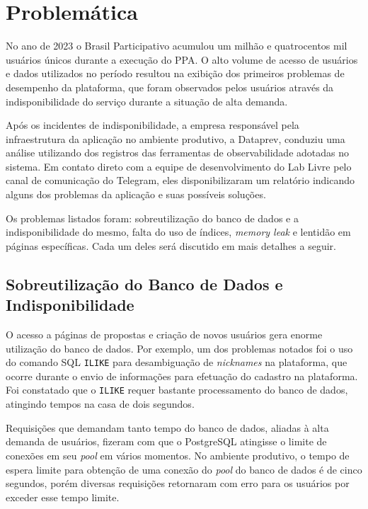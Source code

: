 \section {Problemática}
\label{sec:problematica}

No ano de 2023 o Brasil Participativo acumulou um milhão e quatrocentos mil usuários únicos durante a execução do PPA.
O alto volume de acesso de usuários e dados utilizados no período resultou na exibição dos primeiros problemas de desempenho da plataforma, que foram observados pelos usuários através da indisponibilidade do serviço durante a situação de alta demanda.

Após os incidentes de indisponibilidade, a empresa responsável pela infraestrutura da aplicação no ambiente produtivo, a Dataprev, conduziu uma análise utilizando dos registros das ferramentas de observabilidade adotadas no sistema.
Em contato direto com a equipe de desenvolvimento do Lab Livre pelo canal de comunicação do Telegram, eles disponibilizaram um relatório indicando alguns dos problemas da aplicação e suas possíveis soluções.

Os problemas listados foram: sobreutilização do banco de dados e a indisponibilidade do mesmo, falta do uso de índices, \textit{memory leak} e lentidão em páginas específicas. Cada um deles será discutido em mais detalhes a seguir.

\subsection{Sobreutilização do Banco de Dados e Indisponibilidade}

O acesso a páginas de propostas e criação de novos usuários gera enorme utilização do banco de dados.
Por exemplo, um dos problemas notados foi o uso do comando SQL \texttt{ILIKE} para desambiguação de \textit{nicknames} na plataforma, que ocorre durante o envio de informações para efetuação do cadastro na plataforma.
Foi constatado que o \texttt{ILIKE} requer bastante processamento do banco de dados, atingindo tempos na casa de dois segundos.

Requisições que demandam tanto tempo do banco de dados, aliadas à alta demanda de usuários, fizeram com que o PostgreSQL atingisse o limite de conexões em seu \textit{pool} em vários momentos.
No ambiente produtivo, o tempo de espera limite para obtenção de uma conexão do \textit{pool} do banco de dados é de cinco segundos, porém diversas requisições retornaram com erro para os usuários por exceder esse tempo limite.


